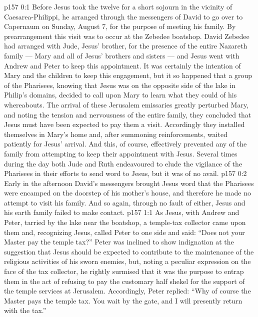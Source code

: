 \author{Midwayer Commission}
\vs p157 0:1 Before Jesus took the twelve for a short sojourn in the vicinity of Caesarea\hyp{}Philippi, he arranged through the messengers of David to go over to Capernaum on Sunday, August 7, for the purpose of meeting his family. By prearrangement this visit was to occur at the Zebedee boatshop. David Zebedee had arranged with Jude, Jesus’ brother, for the presence of the entire Nazareth family --- Mary and all of Jesus’ brothers and sisters --- and Jesus went with Andrew and Peter to keep this appointment. It was certainly the intention of Mary and the children to keep this engagement, but it so happened that a group of the Pharisees, knowing that Jesus was on the opposite side of the lake in Philip’s domains, decided to call upon Mary to learn what they could of his whereabouts. The arrival of these Jerusalem emissaries greatly perturbed Mary, and noting the tension and nervousness of the entire family, they concluded that Jesus must have been expected to pay them a visit. Accordingly they installed themselves in Mary’s home and, after summoning reinforcements, waited patiently for Jesus’ arrival. And this, of course, effectively prevented any of the family from attempting to keep their appointment with Jesus. Several times during the day both Jude and Ruth endeavoured to elude the vigilance of the Pharisees in their efforts to send word to Jesus, but it was of no avail.
\vs p157 0:2 Early in the afternoon David’s messengers brought Jesus word that the Pharisees were encamped on the doorstep of his mother’s house, and therefore he made no attempt to visit his family. And so again, through no fault of either, Jesus and his earth family failed to make contact.
\vs p157 1:1 As Jesus, with Andrew and Peter, tarried by the lake near the boatshop, a temple\hyp{}tax collector came upon them and, recognizing Jesus, called Peter to one side and said: “Does not your Master pay the temple tax?” Peter was inclined to show indignation at the suggestion that Jesus should be expected to contribute to the maintenance of the religious activities of his sworn enemies, but, noting a peculiar expression on the face of the tax collector, he rightly surmised that it was the purpose to entrap them in the act of refusing to pay the customary half shekel for the support of the temple services at Jerusalem. Accordingly, Peter replied: “Why of course the Master pays the temple tax. You wait by the gate, and I will presently return with the tax.”
